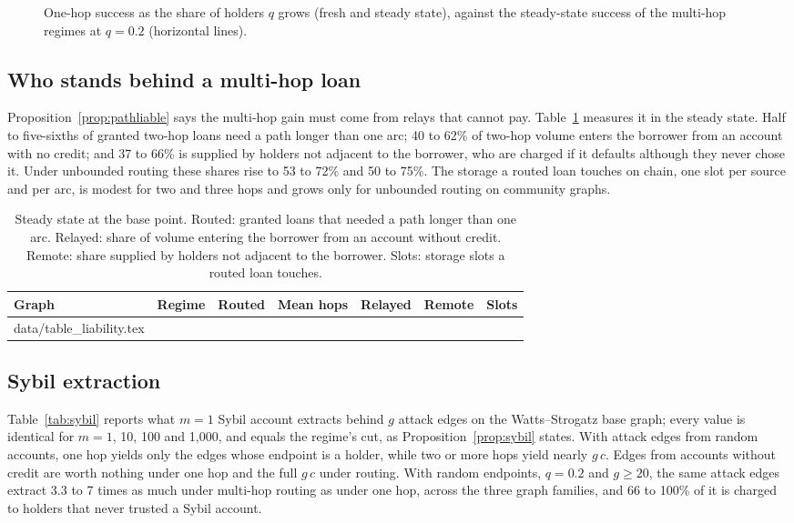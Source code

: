 \documentclass[11pt]{article}
\makeatletter
\theoremstyle{plain}
\theoremstyle{definition}
\newcommand{\inputrows}[1]{\@@input #1 }
\makeatother
\begin{document}
\begin{figure}[ht]
  \centering
  
  \caption{One-hop success as the share of holders $q$ grows (fresh and steady state), against the
  steady-state success of the multi-hop regimes at $q=0.2$ (horizontal lines).}
  \label{fig:equivalence}
\end{figure}

\subsection{Who stands behind a multi-hop loan}

Proposition~\ref{prop:pathliable} says the multi-hop gain must come from relays that cannot pay.
Table~\ref{tab:liability} measures it in the steady state. Half to five-sixths of granted two-hop
loans need a path longer than one arc; 40 to 62\% of two-hop volume enters the borrower from an
account with no credit; and 37 to 66\% is supplied by holders not adjacent to the borrower, who are
charged if it defaults although they never chose it. Under unbounded routing these shares rise to 53
to 72\% and 50 to 75\%. The storage a routed loan touches on chain, one slot per source and per arc,
is modest for two and three hops and grows only for unbounded routing on community graphs.

\begin{table}[ht]
  \centering\small
  \caption{Steady state at the base point. Routed: granted loans that needed a path longer than one
  arc. Relayed: share of volume entering the borrower from an account without credit. Remote: share
  supplied by holders not adjacent to the borrower. Slots: storage slots a routed loan touches.}
  \label{tab:liability}
  \begin{tabular}{llrrrrr}
    \toprule
    Graph & Regime & Routed & Mean hops & Relayed & Remote & Slots \\
    \midrule
    \inputrows{data/table_liability.tex}
    \bottomrule
  \end{tabular}
\end{table}

\subsection{Sybil extraction}

Table~\ref{tab:sybil} reports what $m=1$ Sybil account extracts behind $g$ attack edges on the
Watts--Strogatz base graph; every value is identical for $m=1$, 10, 100 and 1,000, and equals the
regime's cut, as Proposition~\ref{prop:sybil} states. With attack edges from random accounts, one hop
yields only the edges whose endpoint is a holder, while two or more hops yield nearly $g\,c$. Edges
from accounts without credit are worth nothing under one hop and the full $g\,c$ under routing. With
random endpoints, $q=0.2$ and $g\ge20$, the same attack edges extract 3.3 to 7 times as much under
multi-hop routing as under one hop, across the three graph families, and 66 to 100\% of it is charged
to holders that never trusted a Sybil account.
\end{document}
